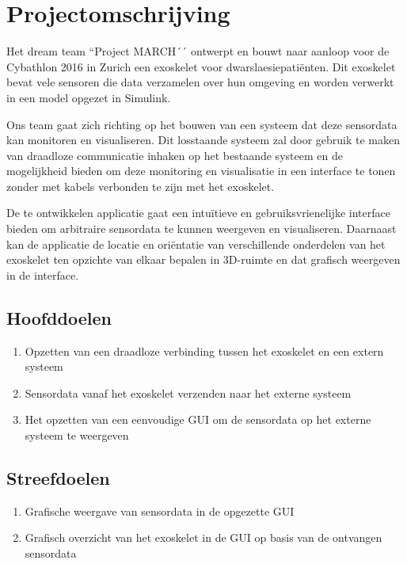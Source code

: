 \section{Projectomschrijving}
Het dream team ``Project MARCH´´ ontwerpt en bouwt naar aanloop voor de Cybathlon 2016 in Zurich een exoskelet voor dwarslaesiepatiënten. Dit exoskelet bevat vele sensoren die data verzamelen over hun omgeving en worden verwerkt in een model opgezet in Simulink.

Ons team gaat zich richting op het bouwen van een systeem dat deze sensordata kan monitoren en visualiseren. Dit losstaande systeem zal door gebruik te maken van draadloze communicatie inhaken op het bestaande systeem en de mogelijkheid bieden om deze monitoring en visualisatie in een interface te tonen zonder met kabels verbonden te zijn met het exoskelet.

De te ontwikkelen applicatie gaat een intuïtieve en gebruiksvrienelijke interface bieden om arbitraire sensordata te kunnen weergeven en visualiseren. Daarnaast kan de applicatie de locatie en oriëntatie van verschillende onderdelen van het exoskelet ten opzichte van elkaar bepalen in 3D-ruimte en dat grafisch weergeven in de interface.
\subsection{Hoofddoelen}
\begin{enumerate}
 \item Opzetten van een draadloze verbinding tussen het exoskelet en een extern systeem
 \item Sensordata vanaf het exoskelet verzenden naar het externe systeem
 \item Het opzetten van een eenvoudige GUI om de sensordata op het externe systeem te weergeven
\end{enumerate}
\subsection{Streefdoelen}
\begin{enumerate}
 \item Grafische weergave van sensordata in de opgezette GUI
 \item Grafisch overzicht van het exoskelet in de GUI op basis van de ontvangen sensordata
\end{enumerate}

